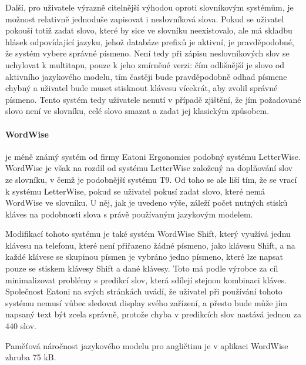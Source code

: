 \documentclass[a4paper,11pt]{article}
\begin{document}
Další, pro uživatele výrazně citelnější výhodou oproti slovníkovým systémům, je možnost relativně jednoduše zapisovat i neslovníková slova. Pokud se uživatel pokouší totiž zadat slovo, které by sice ve slovníku neexistovalo, ale má skladbu hlásek odpovídající jazyku, jehož databáze prefixů je aktivní, je pravděpodobné, že systém vybere správné písmeno. Není tedy při zápisu neslovníkových slov se uchylovat k multitapu, pouze k jeho zmírněné verzi: čím odlišnější je slovo od aktivního jazykového modelu, tím častěji bude pravděpodobně odhad písmene chybný a uživatel bude muset stisknout klávesu vícekrát, aby zvolil správné písmeno. Tento systém tedy uživatele nenutí v případě zjištění, že jím požadované slovo není ve slovníku, celé slovo smazat a zadat jej klasickým způsobem. \parencite[5234]{ghayoomi2009overview} \parencite[112]{MacKenzie2001} 

\paragraph{WordWise}

je méně známý systém od firmy Eatoni Ergonomics podobný systému LetterWise. WordWise je však na rozdíl od systému LetterWise založený na doplňování slov ze slovníku, v čemž je podobnější systému T9. Od toho se ale liší tím, že se vrací k systému LetterWise, pokud se uživatel pokusí zadat slovo, které nemá WordWise ve slovníku. U něj, jak je uvedeno výše, záleží počet nutných stisků kláves na podobnosti slova s právě používaným jazykovým modelem. \parencite{eatoniwordwise}

Modifikací tohoto systému je také systém WordWise Shift, který využívá jednu klávesu na telefonu, které není přiřazeno žádné písmeno, jako klávesu Shift, a na každé klávese se skupinou písmen je vybráno jedno písmeno, které lze napsat pouze se stiskem klávesy Shift a dané klávesy. Toto má podle výrobce za cíl minimalizovat problémy s predikcí slov, která sdílejí stejnou kombinaci kláves. Společnost Eatoni na svých stránkách uvádí, že uživatel při používání tohoto systému nemusí vůbec sledovat display svého zařízení, a přesto bude může jím napsaný text být zcela správně, protože chyba v predikcích slov nastává jednou za 440 slov. \parencite{eatoniwordwise}

Paměťová náročnost jazykového modelu pro angličtinu je v aplikaci WordWise zhruba 75 kB. \parencite{eatoniwordwise} %
\end{document}
